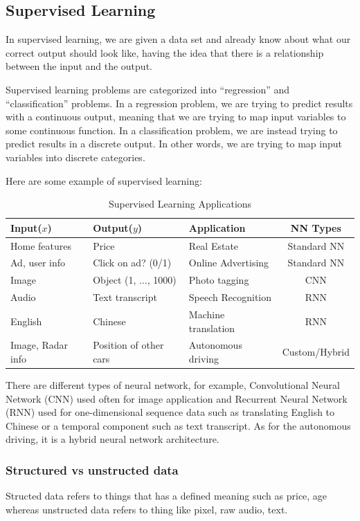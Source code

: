 \documentclass[UTF8]{article}
\begin{document}
\subsection{Supervised Learning}
In supervised learning, we are given a data set and already know about what our correct output
should look like, having the idea that there is a relationship between the input and the output.

Supervised learning problems are categorized into ``regression'' and ``classification'' problems.
In a regression problem, we are trying to predict results with a continuous output, meaning that we
are trying to map input variables to some continuous function. In a classification problem, we are
instead trying to predict results in a discrete output. In other words, we are trying to map input
variables into discrete categories.

Here are some example of supervised learning:
\begin{table}[htb]
\centering
\caption{Supervised Learning Applications}
\begin{tabular}{lllc}
\textbf{Input($x$)} & \textbf{Output($y$)} & \textbf{Application}
& \textbf{NN Types} \\ \hline
Home features & Price & Real Estate & Standard NN \\
Ad, user info & Click on ad? (0/1) & Online Advertising & Standard NN \\
Image & Object (1, ..., 1000) & Photo tagging & CNN \\
Audio & Text transcript & Speech Recognition & RNN \\
English & Chinese & Machine translation & RNN \\
Image, Radar info & Position of other cars & Autonomous driving & Custom/Hybrid \\
\end{tabular}
\end{table}

There are different types of neural network, for example, Convolutional Neural Network (CNN) used
often for image application and Recurrent Neural Network (RNN) used for one-dimensional sequence
data such as translating English to Chinese or a temporal component such as text transcript. As for
the autonomous driving, it is a hybrid neural network architecture.

\subsubsection{Structured vs unstructed data}
Structed data refers to things that has a defined meaning such as price, age whereas unstructed
data refers to thing like pixel, raw audio, text.
\end{document}
